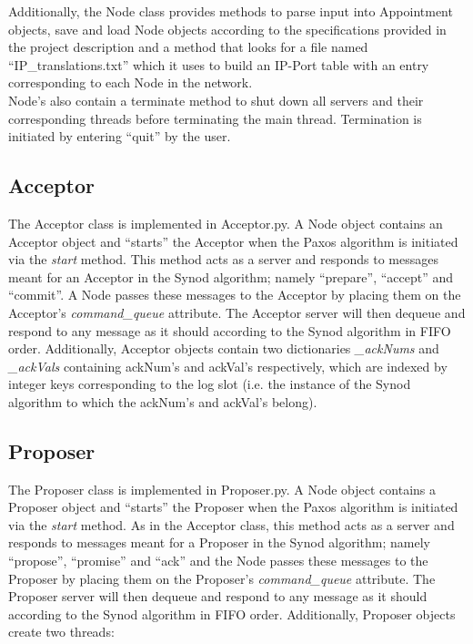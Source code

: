 \documentclass{article}
\begin{document}
		\noindent Additionally, the Node class provides methods to parse input into Appointment objects, save and load Node objects according to the specifications provided in the project description and a method that looks for a file named ``IP\_translations.txt'' which it uses to build an IP-Port table with an entry corresponding to each Node in the network. \\
		
		\noindent Node's also contain a terminate method to shut down all servers and their corresponding threads before terminating the main thread. Termination is initiated by entering ``quit'' by the user.
		
	\subsection{Acceptor}
		The Acceptor class is implemented in Acceptor.py. A Node object contains an Acceptor object and ``starts'' the Acceptor when the Paxos algorithm is initiated via the \textit{start} method. This method acts as a server and responds to messages meant for an Acceptor in the Synod algorithm; namely ``prepare'', ``accept'' and ``commit''.
		A Node passes these messages to the Acceptor by placing them on the Acceptor's \textit{command\_queue} attribute.
		The Acceptor server will then dequeue and respond to any message as it should according to the Synod algorithm in FIFO order. Additionally, Acceptor objects contain two dictionaries \textit{\_ackNums} and \textit{\_ackVals} containing ackNum's and ackVal's respectively, which are indexed by integer keys corresponding to the log slot (i.e. the instance of the Synod algorithm to which the ackNum's and ackVal's belong).

	\subsection{Proposer}
		The Proposer class is implemented in Proposer.py. A Node object contains a Proposer object and ``starts'' the Proposer when the Paxos algorithm is initiated via the \textit{start} method. As in the Acceptor class, this method acts as a server and responds to messages meant for a Proposer in the Synod algorithm; namely ``propose'', ``promise'' and ``ack'' and the Node passes these messages to the Proposer by placing them on the Proposer's \textit{command\_queue} attribute.
		The Proposer server will then dequeue and respond to any message as it should according to the Synod algorithm in FIFO order. Additionally, Proposer objects create two threads:
		
\end{document}
